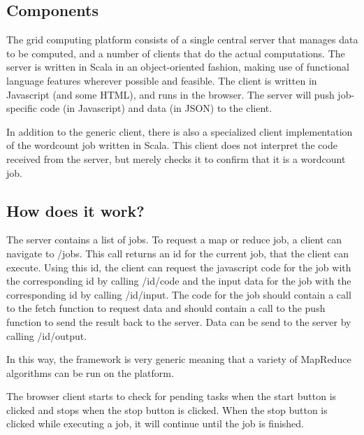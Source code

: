 
\subsection{Components}
The grid computing platform consists of a single central server that manages
data to be computed, and a number of clients that do the actual computations.
The server is written in Scala in an object-oriented fashion, making use of
functional language features wherever possible and feasible. The client is
written in Javascript (and some HTML), and runs in the browser. The server will
push job-specific code (in Javascript) and data (in JSON) to the client.

In addition to the generic client, there is also a specialized client
implementation of the wordcount job written in Scala. This client does not
interpret the code received from the server, but merely checks it to confirm
that it is a wordcount job.
	
	\subsection{How does it work?}
		The server contains a list of jobs. To request a map or reduce job, a client can navigate to /jobs. 
		This call returns an id for the current job, that the client can execute. Using this id, 
		the client can request the javascript code for the job with the corresponding id by calling /{id}/code
		and the input data for the job with the corresponding id by calling /{id}/input.
		The code for the job should contain a call to the fetch function to request data and should contain a call to the push
		function to send the result back to the server.
		Data can be send to the server by calling /{id}/output.
		
		In this way, the framework is very generic meaning that a variety of MapReduce algorithms can be run on the platform.
		
		The browser client starts to check for pending tasks when the start button is clicked and stops when the stop button is clicked.
		When the stop button is clicked while executing a job, it will continue until the job is finished.